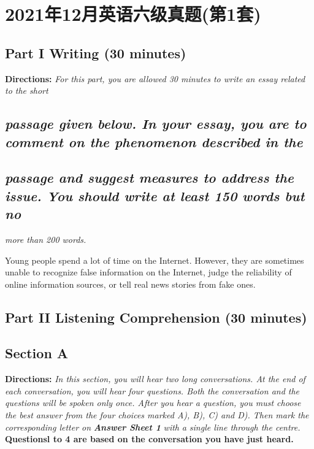 \documentclass[UTF8,11pt]{ctexart}
\begin{document}
\section*{2021年12月英语六级真题(第1套)}
\subsection*{\textbf{Part }I \textbf{Writing} \textbf{(30 minutes)}}


\textbf{Directions: }\textit{For this part, you are allowed 30 minutes to write an essay related to the short}


\subsection*{\textit{passage given below. In your essay, you are to comment on the phenomenon described in the}}


\subsection*{\textit{passage and suggest measures to address the issue. You should write at least 150 words but no}}


\textit{more than 200 words.}


Young people spend a lot of time on the Internet. However, they are sometimes unable to recognize false information on the Internet, judge the reliability of online information sources, or tell real news stories from fake ones.


\subsection*{\textbf{Part }II \textbf{Listening Comprehension} \textbf{(30 minutes)}}


\subsection*{\textbf{Section A}}


\textbf{Directions: }\textit{In this section, you will hear two long conversations. At the end of each} \textit{conversation, you will hear four questions. Both the conversation and the questions will be} \textit{spoken only once. After you hear a question, you must choose the best answer from the four} \textit{choices marked A), B), C) and D). Then mark the corresponding letter on }\textbf{\textit{Answer Sheet 1 }}\textit{with} \textit{a single line through the centre.} \textbf{Questionsl to 4 are based on the conversation you have just heard.}
\end{document}
